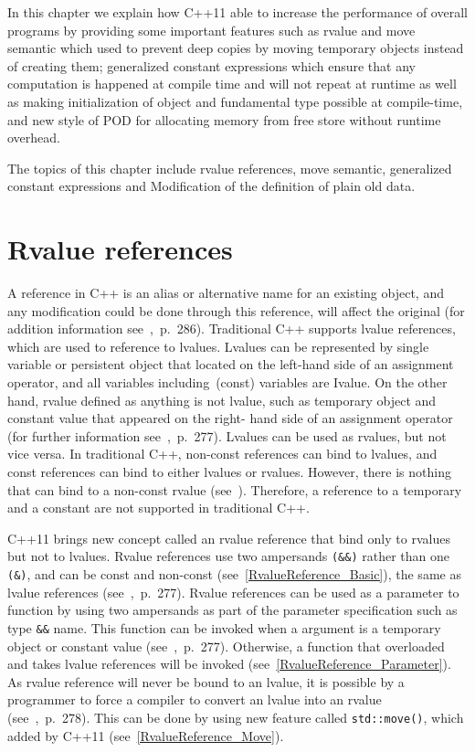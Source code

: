 \documentclass[11pt]{report}
\begin{document}
In this chapter we explain how C++11 able to increase the performance of overall programs by providing some important features such as rvalue and move semantic which used to prevent deep copies by moving temporary objects instead of creating them; generalized constant expressions which ensure that any computation is happened at compile time and will not repeat at runtime as well as making initialization of object and fundamental type possible at compile-time, and new style of POD for allocating memory from free store without runtime overhead.

The topics of this chapter include rvalue references, move semantic, generalized constant expressions and Modification of the definition of plain old data.


\section{Rvalue references}
\label{section: Rvalue references}
A reference in C++ is an alias or alternative name for an existing object, and any modification could be done through this reference, will affect the original (for addition information see~\cite{Gregorie:professionalcpp},~p.~286). Traditional C++ supports lvalue references, which are used to reference to lvalues. Lvalues can be represented by single variable or persistent object that located on the left-hand side of an assignment operator, and all variables including~(const) variables are Ivalue. On the other hand, rvalue defined as anything is not lvalue, such as temporary object and constant value that appeared on the right- hand side of an assignment operator (for further information see~\cite{Gregorie:professionalcpp},~p.~277). Lvalues can be used as rvalues, but not vice versa. In traditional C++, non-const references can bind to lvalues, and const references can bind to either lvalues or rvalues. However, there is nothing that can bind to a non-const rvalue (see~\cite{Stroustrup:2012:Cpp11}). Therefore, a reference to a temporary and a constant are not supported in traditional C++.

C++11 brings new concept called an rvalue reference that bind only to rvalues but not to lvalues. Rvalue references use two ampersands \texttt{(\&\&)} rather than one \texttt{(\&)}, and can be const and non-const (see~\ref{RvalueReference_Basic}), the same as lvalue references  (see~\cite{Gregorie:professionalcpp},~p.~277). Rvalue references can be used as a parameter to function by using two ampersands as part of the parameter specification such as type \texttt{\&\&} name. This function can be invoked when a argument is a temporary object or constant value (see~\cite{Gregorie:professionalcpp},~p.~277). Otherwise, a function that overloaded and takes lvalue references will be invoked (see~\ref{RvalueReference_Parameter}). As rvalue reference will never be bound to an lvalue, it is possible by a programmer to force a compiler to convert an lvalue into an rvalue (see~\cite{Gregorie:professionalcpp},~p.~278). This can be done by using new feature called \texttt{std::move()}, which added by C++11 (see~\ref{RvalueReference_Move}).
\end{document}
